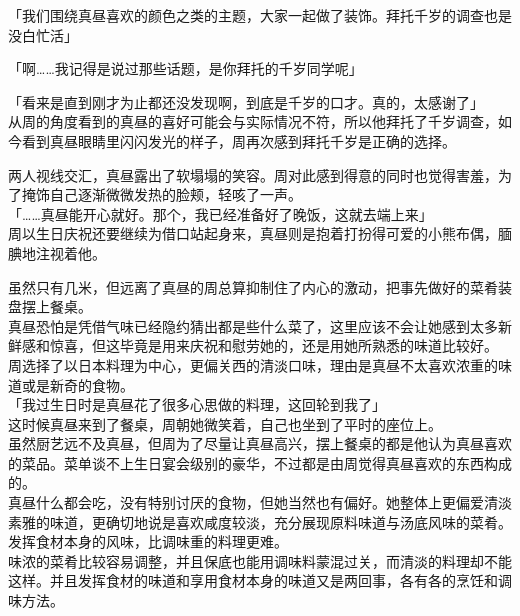 「我们围绕真昼喜欢的颜色之类的主题，大家一起做了装饰。拜托千岁的调查也是没白忙活」

「啊……我记得是说过那些话题，是你拜托的千岁同学呢」

「看来是直到刚才为止都还没发现啊，到底是千岁的口才。真的，太感谢了」\\

从周的角度看到的真昼的喜好可能会与实际情况不符，所以他拜托了千岁调查，如今看到真昼眼睛里闪闪发光的样子，周再次感到拜托千岁是正确的选择。

两人视线交汇，真昼露出了软塌塌的笑容。周对此感到得意的同时也觉得害羞，为了掩饰自己逐渐微微发热的脸颊，轻咳了一声。\\

「……真昼能开心就好。那个，我已经准备好了晚饭，这就去端上来」\\

周以生日庆祝还要继续为借口站起身来，真昼则是抱着打扮得可爱的小熊布偶，腼腆地注视着他。\\

\vspace{2\baselineskip}

虽然只有几米，但远离了真昼的周总算抑制住了内心的激动，把事先做好的菜肴装盘摆上餐桌。\\

真昼恐怕是凭借气味已经隐约猜出都是些什么菜了，这里应该不会让她感到太多新鲜感和惊喜，但这毕竟是用来庆祝和慰劳她的，还是用她所熟悉的味道比较好。\\

周选择了以日本料理为中心，更偏关西的清淡口味，理由是真昼不太喜欢浓重的味道或是新奇的食物。\\

「我过生日时是真昼花了很多心思做的料理，这回轮到我了」\\

这时候真昼来到了餐桌，周朝她微笑着，自己也坐到了平时的座位上。\\

虽然厨艺远不及真昼，但周为了尽量让真昼高兴，摆上餐桌的都是他认为真昼喜欢的菜品。菜单谈不上生日宴会级别的豪华，不过都是由周觉得真昼喜欢的东西构成的。\\

真昼什么都会吃，没有特别讨厌的食物，但她当然也有偏好。她整体上更偏爱清淡素雅的味道，更确切地说是喜欢咸度较淡，充分展现原料味道与汤底风味的菜肴。\\

发挥食材本身的风味，比调味重的料理更难。\\

味浓的菜肴比较容易调整，并且保底也能用调味料蒙混过关，而清淡的料理却不能这样。并且发挥食材的味道和享用食材本身的味道又是两回事，各有各的烹饪和调味方法。

